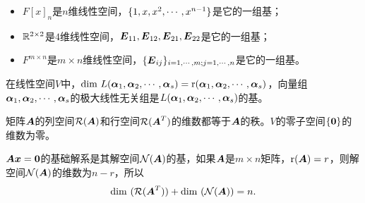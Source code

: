 \begin{frame}

  \vspace{.1in} 
  \begin{li}
    \begin{itemize}
      \item $F[x]_n$是$n$维线性空间，$\{1,x,x^2,\cdots,x^{n-1}\}$是它的一组基；\vspace{.1in} 
      \item $\mathbb R^{2\times 2}$是$4$维线性空间，$\boldsymbol{E}_{11},\boldsymbol{E}_{12},\boldsymbol{E}_{21},\boldsymbol{E}_{22}$是它的一组基；\vspace{.1in} 
      \item $F^{m\times n}$是$m\times n$维线性空间，$\{\boldsymbol{E}_{ij}\}_{i=1,\cdots,m; j=1,\cdots,n}$是它的一组基。
    \end{itemize}
  \end{li}
\end{frame}

\begin{frame}
  在线性空间$V$中，$\mathrm{dim~} L(\boldsymbol{\alpha}_1,\boldsymbol{\alpha}_2,\cdots,\boldsymbol{\alpha}_s) = \mathrm{r}(\boldsymbol{\alpha}_1,\boldsymbol{\alpha}_2,\cdots,\boldsymbol{\alpha}_s)$，向量组$\boldsymbol{\alpha}_1,\boldsymbol{\alpha}_2,\cdots,\boldsymbol{\alpha}_s$的极大线性无关组是$L(\boldsymbol{\alpha}_1,\boldsymbol{\alpha}_2,\cdots,\boldsymbol{\alpha}_s)$的基。\vspace{.1in}  

  \begin{li}
    矩阵$\boldsymbol{A}$的列空间$\mathcal R(\boldsymbol{A})$和行空间$\mathcal R(\boldsymbol{A}^T)$的维数都等于$\boldsymbol{A}$的秩。$V$的零子空间$\{\M0\}$的维数为零。
  \end{li}
\end{frame}

\begin{frame}
  $\MA\vx = \M0$的基础解系是其解空间$\mathcal N(\boldsymbol{A})$的基，如果$\boldsymbol{A}$是$m\times n$矩阵，$\mathrm{r}(\boldsymbol{A})=r$，则解空间$\mathcal N(\boldsymbol{A})$的维数为$n-r$，所以
  $$
  \mathrm{dim~}(\mathcal R(\boldsymbol{A}^T)) + \mathrm{dim~}(\mathcal N(\boldsymbol{A})) = n. 
  $$
\end{frame}


